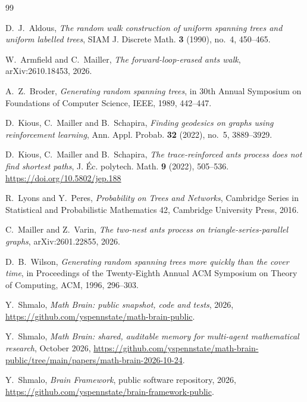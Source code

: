 \documentclass[11pt]{amsart}
\theoremstyle{remark}
\begin{document}
\begin{thebibliography}{99}

 D.~J.~Aldous, \emph{The random walk construction of uniform spanning trees and uniform labelled trees}, SIAM J. Discrete Math. \textbf{3} (1990), no.~4, 450--465.

 W.~Armfield and C.~Mailler, \emph{The forward-loop-erased ants walk}, arXiv:2610.18453, 2026.

 A.~Z.~Broder, \emph{Generating random spanning trees}, in 30th Annual Symposium on Foundations of Computer Science, IEEE, 1989, 442--447.

 D.~Kious, C.~Mailler and B.~Schapira, \emph{Finding geodesics on graphs using reinforcement learning}, Ann. Appl. Probab. \textbf{32} (2022), no.~5, 3889--3929.

 D.~Kious, C.~Mailler and B.~Schapira, \emph{The trace-reinforced ants process does not find shortest paths}, J. \'Ec. polytech. Math. \textbf{9} (2022), 505--536. \url{https://doi.org/10.5802/jep.188}

 R.~Lyons and Y.~Peres, \emph{Probability on Trees and Networks}, Cambridge Series in Statistical and Probabilistic Mathematics 42, Cambridge University Press, 2016.

 C.~Mailler and Z.~Varin, \emph{The two-nest ants process on triangle-series-parallel graphs}, arXiv:2601.22855, 2026.

 D.~B.~Wilson, \emph{Generating random spanning trees more quickly than the cover time}, in Proceedings of the Twenty-Eighth Annual ACM Symposium on Theory of Computing, ACM, 1996, 296--303.

 Y.~Shmalo, \emph{Math Brain: public snapshot, code and tests}, 2026, \url{https://github.com/yspennstate/math-brain-public}.

 Y.~Shmalo, \emph{Math Brain: shared, auditable memory for multi-agent mathematical research}, October 2026, \url{https://github.com/yspennstate/math-brain-public/tree/main/papers/math-brain-2026-10-24}.

 Y.~Shmalo, \emph{Brain Framework}, public software repository, 2026, \url{https://github.com/yspennstate/brain-framework-public}.

\end{thebibliography}
\end{document}
